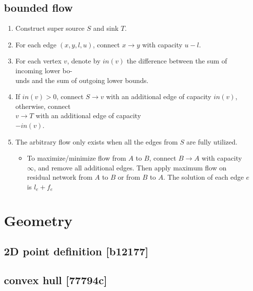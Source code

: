 \subsection{bounded flow}
\onehalfspacing
\begin{enumerate}
    \item Construct super source \mbox{\large\(S\)} and sink \mbox{\large\(T\)}.
    \item For each edge \mbox{\large\((x, y, l, u)\)}, connect \mbox{\large\(x \rightarrow y\)} with capacity \mbox{\large\(u - l\)}.
    \item For each vertex \mbox{\large\(v\)}, denote by \mbox{\large\(in(v)\)} the difference between the sum of incoming lower bo-\\unds and the sum of outgoing lower bounds.
    \item If \mbox{\large\(in(v) > 0\)}, connect \mbox{\large\(S \rightarrow v\)} with an additional edge of capacity \mbox{\large\(in(v)\)}, otherwise, connect\\ \mbox{\large\(v \rightarrow T\)} with an additional edge of capacity\\ \mbox{\large\(-in(v)\)}.
    \item The arbitrary flow only exists when all the edges from \mbox{\large\(S\)} are fully utilized.
    \begin{itemize}
        \item To maximize/minimize flow from \mbox{\large\(A\)} to \mbox{\large\(B\)}, connect \mbox{\large\(B \rightarrow A\)} with capacity \mbox{\large\(\infty\)}, and remove all additional edges. Then apply maximum flow on residual network from \mbox{\large\(A\)} to \mbox{\large\(B\)} or from \mbox{\large\(B\)} to \mbox{\large\(A\)}. The solution of each edge \mbox{\large\(e\)} is \mbox{\large\(l_e + f_e\)}
    \end{itemize}
\end{enumerate}
\singlespacing

\section{Geometry}
\subsection{2D point definition {\footnotesize [b12177]} }

\subsection{convex hull {\footnotesize [77794c]} }

